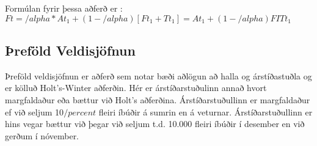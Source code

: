\documentclass[12pt]{article}
\begin{document}
Formúlan fyrir þessa aðferð er : $Ft = /alpha * At_1 + (1-/alpha) [Ft_1 + Tt_1] =  At_1 + (1-/alpha) FITt_1$


\subsection{Þreföld Veldisjöfnun}
Þreföld veldisjöfnun er aðferð sem notar bæði aðlögun að halla og árstíðastuðla og er kölluð Holt’s-Winter aðferðin. Hér er árstíðarstuðulinn annað hvort margfaldaður eða bættur við Holt’s aðferðina.
Árstíðarstuðullinn er margfaldaður ef við seljum 10$/percent$ fleiri íbúðir á sumrin en á veturnar. Árstíðarstuðullinn er hins vegar bættur við þegar við seljum t.d. 10.000 fleiri íbúðir í desember en við gerðum í nóvember.
 



%
%
\end{document}
